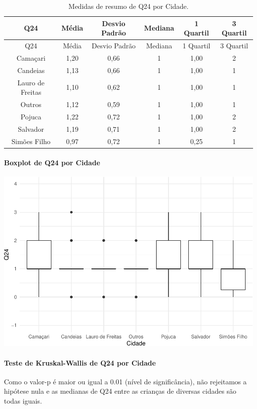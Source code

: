 \documentclass[]{article}
\let\oldparagraph\paragraph
\renewcommand{\paragraph}[1]{\oldparagraph{#1}\mbox{}}
\begin{document}
\begin{longtable}[]{@{}cccccc@{}}
\caption{\label{tab:unnamed-chunk-607}Medidas de resumo de Q24 por Cidade.}\tabularnewline
\toprule
Q24 & Média & Desvio Padrão & Mediana & 1 Quartil & 3 Quartil\tabularnewline
\midrule
\endfirsthead
\toprule
Q24 & Média & Desvio Padrão & Mediana & 1 Quartil & 3 Quartil\tabularnewline
\midrule
\endhead
Camaçari & 1,20 & 0,66 & 1 & 1,00 & 2\tabularnewline
Candeias & 1,13 & 0,66 & 1 & 1,00 & 1\tabularnewline
Lauro de Freitas & 1,10 & 0,62 & 1 & 1,00 & 1\tabularnewline
Outros & 1,12 & 0,59 & 1 & 1,00 & 1\tabularnewline
Pojuca & 1,22 & 0,72 & 1 & 1,00 & 2\tabularnewline
Salvador & 1,19 & 0,71 & 1 & 1,00 & 2\tabularnewline
Simões Filho & 0,97 & 0,72 & 1 & 0,25 & 1\tabularnewline
\bottomrule
\end{longtable}

\hypertarget{boxplot-de-q24-por-cidade}{%
\paragraph{Boxplot de Q24 por Cidade}\label{boxplot-de-q24-por-cidade}}

\begin{center}\includegraphics[width=0.75\linewidth]{relatorio_covid19_files/figure-latex/unnamed-chunk-608-1} \end{center}

\hypertarget{teste-de-kruskal-wallis-de-q24-por-cidade}{%
\paragraph{Teste de Kruskal-Wallis de Q24 por Cidade}\label{teste-de-kruskal-wallis-de-q24-por-cidade}}

Como o valor-p é maior ou igual a 0.01 (nível de significância), não rejeitamos a hipótese nula e as medianas de Q24 entre as crianças de diversas cidades são todas iguais.
\end{document}
